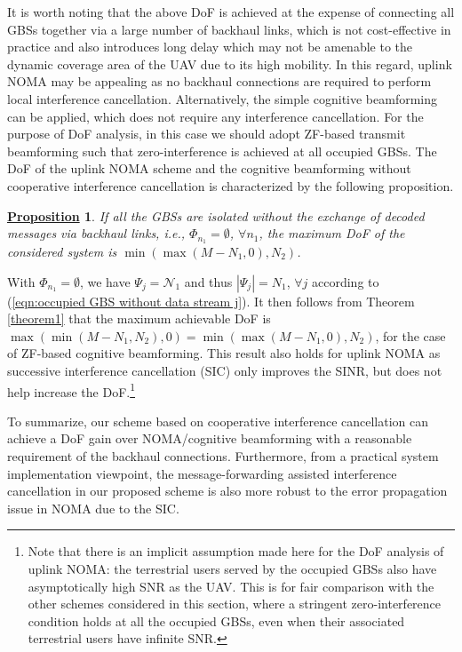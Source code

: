 \documentclass[onecolumn, draftclsnofoot, 12pt]{IEEEtran}
\newtheorem{proposition}{\underline{Proposition}}
\begin{document}
It is worth noting that the above DoF is achieved at the expense of connecting all GBSs together via a large number of backhaul links, which is not cost-effective in practice and also introduces long delay which may not be amenable to the dynamic coverage area of the UAV due to its high mobility. In this regard, uplink NOMA may be appealing as no backhaul connections are required to perform local interference cancellation. Alternatively, the simple cognitive beamforming can be applied, which does not require any interference cancellation. For the purpose of DoF analysis, in this case we should adopt ZF-based transmit beamforming such that zero-interference is achieved at all occupied GBSs.  The DoF of the uplink NOMA scheme and the cognitive beamforming without cooperative interference cancellation is characterized by the following proposition.
\begin{proposition}\label{proposition2}
If all the GBSs are isolated without the exchange of decoded messages via backhaul links, i.e., $\Phi_{n_1}=\emptyset$, $\forall n_1$, the maximum DoF of the considered system is $\min(\max(M-N_1,0),N_2)$.
\end{proposition}
\begin{IEEEproof}
With $\Phi_{n_1}=\emptyset$, we have $\Psi_j=\mathcal{N}_1$ and thus $|\Psi_j|=N_1$, $\forall j$ according to (\ref{eqn:occupied GBS without data stream j}). It then follows from Theorem \ref{theorem1} that the maximum achievable DoF is $\max(\min(M-N_1,N_2),0)=\min(\max(M-N_1,0),N_2)$, for the case of ZF-based cognitive beamforming. This result also holds for uplink NOMA as successive interference cancellation (SIC) only improves the SINR, but does not help increase the DoF.\footnote{Note that there is an implicit assumption made here for the DoF analysis of uplink NOMA: the terrestrial users served by the occupied GBSs also have asymptotically high SNR as the UAV. This is for fair comparison with the other schemes considered in this section, where a stringent zero-interference condition holds at all the occupied GBSs, even when their associated terrestrial users have infinite SNR.}
\end{IEEEproof}

To summarize, our scheme based on cooperative interference cancellation can achieve a DoF gain over NOMA/cognitive beamforming with a reasonable requirement of the backhaul connections. Furthermore, from a practical system implementation viewpoint, the message-forwarding assisted interference cancellation in our proposed scheme is also more robust to the error propagation issue in NOMA due to the SIC.
\end{document}
